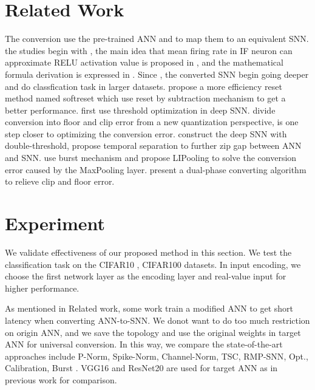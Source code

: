 \documentclass{article}
\begin{document}
\section{Related Work}
The conversion use the pre-trained ANN and to map them to an equivalent SNN. the studies begin with \cite{perez2013mapping}, the main idea that mean firing rate in IF neuron can approximate RELU activation value is proposed in \cite{diehl2015fast},
and the mathematical formula derivation is expressed in \cite{rueckauer2017conversion}. Since \cite{sengupta2019going}, the converted SNN begin going deeper and do classfication task in larger datasets. \cite{han2020rmp} propose a more efficiency reset method named softreset which use reset by subtraction mechanism to get a better performance.
\cite{rathi2020diet} first use threshold optimization in deep SNN. \cite{deng2021optimal} divide conversion into floor and clip error from a new quantization perspective, \cite{li2021free} is one step closer to optimizing the conversion error.
\cite{yu2021constructing} construct the deep SNN with double-threshold, \cite{liu2022spikeconverter} propose temporal separation to further zip gap between ANN and SNN. \cite{li2022efficient} use burst mechanism and propose LIPooling to solve the conversion error caused by the MaxPooling layer.
\cite{wang2022towards} present a dual-phase converting algorithm to relieve clip and floor error. 


\section{Experiment}
We validate effectiveness of our proposed method in this section. We test the classification task on the CIFAR10 \cite{krizhevsky2009learning}, CIFAR100 \cite{krizhevsky2009learning} datasets.
In input encoding, we choose the first network layer as the encoding layer and real-value input for higher performance.

As mentioned in Related work, some work train a modified ANN to get short latency when converting ANN-to-SNN. We donot want to do too much restriction on origin ANN, 
and we save the topology and use the original weights in target ANN for universal conversion. In this way, we compare the state-of-the-art approaches include P-Norm\cite{rueckauer2017conversion}, Spike-Norm\cite{sengupta2019going},
Channel-Norm\cite{kim2020spiking}, TSC\cite{han2020deep}, RMP-SNN\cite{han2020rmp}, Opt.\cite{deng2021optimal}, Calibration\cite{li2021free}, Burst \cite{li2022efficient}. 
VGG16 and ResNet20 are used for target ANN as in previous work for comparison. 
\end{document}
